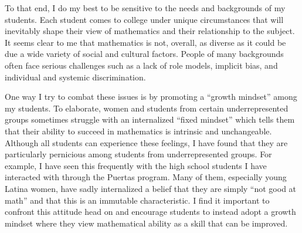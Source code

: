 \documentclass{article}
\begin{document}
To that end, I do my best to be sensitive to the needs and backgrounds of my students. Each student comes to college under unique circumstances that will inevitably shape their view of mathematics and their relationship to the subject. It seems clear to me that mathematics is not, overall, as diverse as it could be due a wide variety of social and cultural factors. People of many backgrounds often face serious challenges such as a lack of role models, implicit bias, and individual and systemic discrimination. 

One way I try to combat these issues is by promoting a ``growth mindset'' among my students. To elaborate, women and students from certain underrepresented groups sometimes struggle with an internalized ``fixed mindset'' which tells them that their ability to succeed in mathematics is intrinsic and unchangeable. Although all students can experience these feelings, I have found that they are particularly pernicious among students from underrepresented groups. For example, I have seen this frequently with the high school students I have interacted with through the Puertas program. Many of them, especially young Latina women, have sadly internalized a belief that they are simply ``not good at math'' and that this is an immutable characteristic. I find it important to confront this attitude head on and encourage students to instead adopt a growth mindset where they view mathematical ability as a skill that can be improved.
\end{document}
